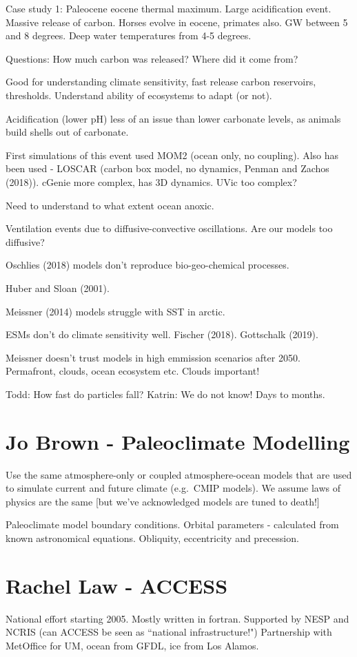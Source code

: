 \documentclass[12pt]{article}
\begin{document}
Case study 1: Paleocene eocene thermal maximum. Large acidification event. Massive release of carbon. Horses evolve in eocene, primates also. GW between 5 and 8 degrees. Deep water temperatures from 4-5 degrees. 

Questions: How much carbon was released? Where did it come from? 

Good for understanding climate sensitivity, fast release carbon reservoirs, thresholds. Understand ability of ecosystems to adapt (or not). 

Acidification (lower pH) less of an issue than lower carbonate levels, as animals build shells out of carbonate. 

First simulations of this event used MOM2 (ocean only, no coupling). Also has been used - LOSCAR (carbon box model, no dynamics, Penman and Zachos (2018)). cGenie more complex, has 3D dynamics. UVic too complex? 

Need to understand to what extent ocean anoxic. 

Ventilation events due to diffusive-convective oscillations. Are our models too diffusive?

Oschlies (2018) models don't reproduce bio-geo-chemical processes. 

Huber and Sloan (2001).

Meissner (2014) models struggle with SST in arctic.

ESMs don't do climate sensitivity well. Fischer (2018). Gottschalk (2019).

Meissner doesn't trust models in high emmission scenarios after 2050. Permafront, clouds, ocean ecosystem etc. Clouds important!

Todd: How fast do particles fall? Katrin: We do not know! Days to months. 

\section{Jo Brown - Paleoclimate Modelling}
Use the same atmosphere-only or coupled atmosphere-ocean models that are used to simulate current and future climate (e.g.~CMIP models). We assume laws of physics are the same [but we've acknowledged models are tuned to death!]

Paleoclimate model boundary conditions. Orbital parameters - calculated from known astronomical equations. Obliquity, eccentricity and precession. 

\section{Rachel Law - ACCESS}
National effort starting 2005. Mostly written in fortran. Supported by NESP and NCRIS (can ACCESS be seen as ``national infrastructure!") Partnership with MetOffice for UM, ocean from GFDL, ice from Los Alamos. 
\end{document}
